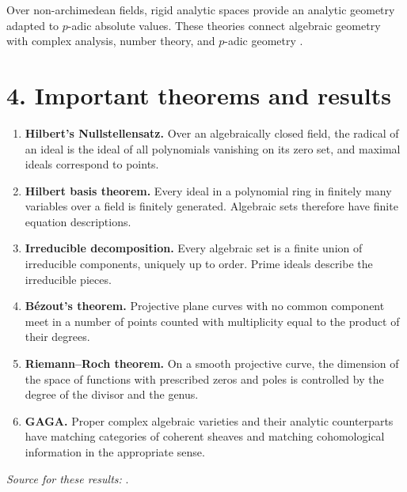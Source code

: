 Over non-archimedean fields, rigid analytic spaces provide an analytic geometry adapted to $p$-adic absolute values. These theories connect algebraic geometry with complex analysis, number theory, and $p$-adic geometry \cite{algebraic_geometry_ref7}.

\section*{4. Important theorems and results}
\begin{enumerate}[leftmargin=*,itemsep=0.35em]

\item \textbf{Hilbert's Nullstellensatz.} Over an algebraically closed field, the radical of an ideal is the ideal of all polynomials vanishing on its zero set, and maximal ideals correspond to points.

\item \textbf{Hilbert basis theorem.} Every ideal in a polynomial ring in finitely many variables over a field is finitely generated. Algebraic sets therefore have finite equation descriptions.

\item \textbf{Irreducible decomposition.} Every algebraic set is a finite union of irreducible components, uniquely up to order. Prime ideals describe the irreducible pieces.

\item \textbf{Bézout's theorem.} Projective plane curves with no common component meet in a number of points counted with multiplicity equal to the product of their degrees.

\item \textbf{Riemann--Roch theorem.} On a smooth projective curve, the dimension of the space of functions with prescribed zeros and poles is controlled by the degree of the divisor and the genus.

\item \textbf{GAGA.} Proper complex algebraic varieties and their analytic counterparts have matching categories of coherent sheaves and matching cohomological information in the appropriate sense.
\end{enumerate}
\noindent\emph{Source for these results:} \cite{algebraic_geometry_ref1}.

